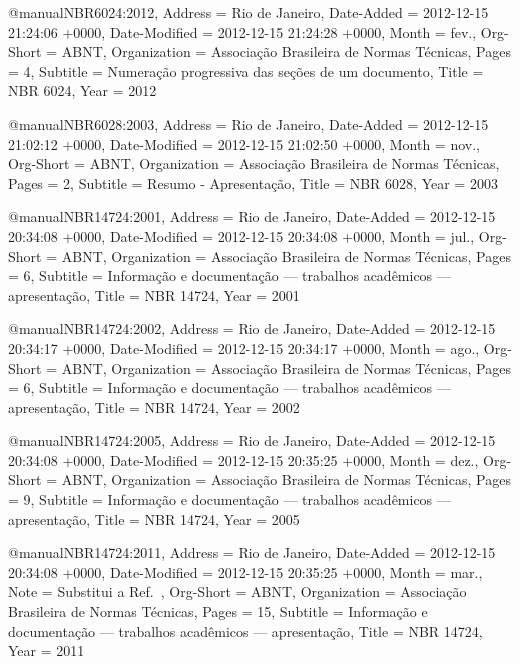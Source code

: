 @manual{NBR6024:2012,
	Address = {Rio de Janeiro},
	Date-Added = {2012-12-15 21:24:06 +0000},
	Date-Modified = {2012-12-15 21:24:28 +0000},
	Month = {fev.},
	Org-Short = {ABNT},
	Organization = {Associa{\c c}\~ao Brasileira de Normas T\'ecnicas},
	Pages = 4,
	Subtitle = {Numera{\c c}\~ao progressiva das se{\c c}\~oes de um documento},
	Title = {{NBR} 6024},
	Year = 2012}

@manual{NBR6028:2003,
	Address = {Rio de Janeiro},
	Date-Added = {2012-12-15 21:02:12 +0000},
	Date-Modified = {2012-12-15 21:02:50 +0000},
	Month = {nov.},
	Org-Short = {ABNT},
	Organization = {Associa{\c c}\~ao Brasileira de Normas T\'ecnicas},
	Pages = 2,
	Subtitle = {Resumo - Apresenta{\c c}{\~a}o},
	Title = {{NBR} 6028},
	Year = 2003}

@manual{NBR14724:2001,
	Address = {Rio de Janeiro},
	Date-Added = {2012-12-15 20:34:08 +0000},
	Date-Modified = {2012-12-15 20:34:08 +0000},
	Month = {jul.},
	Org-Short = {ABNT},
	Organization = {Associa{\c c}\~ao Brasileira de Normas T\'ecnicas},
	Pages = 6,
	Subtitle = {Informa{\c c}\~ao e documenta{\c c}\~ao --- trabalhos acad\^emicos --- apresenta{\c c}\~ao},
	Title = {{NBR} 14724},
	Year = 2001}

@manual{NBR14724:2002,
	Address = {Rio de Janeiro},
	Date-Added = {2012-12-15 20:34:17 +0000},
	Date-Modified = {2012-12-15 20:34:17 +0000},
	Month = {ago.},
	Org-Short = {ABNT},
	Organization = {Associa{\c c}\~ao Brasileira de Normas T\'ecnicas},
	Pages = 6,
	Subtitle = {Informa{\c c}\~ao e documenta{\c c}\~ao --- trabalhos acad\^emicos --- apresenta{\c c}\~ao},
	Title = {{NBR} 14724},
	Year = 2002}

@manual{NBR14724:2005,
	Address = {Rio de Janeiro},
	Date-Added = {2012-12-15 20:34:08 +0000},
	Date-Modified = {2012-12-15 20:35:25 +0000},
	Month = {dez.},
	Org-Short = {ABNT},
	Organization = {Associa{\c c}\~ao Brasileira de Normas T\'ecnicas},
	Pages = 9,
	Subtitle = {Informa{\c c}\~ao e documenta{\c c}\~ao --- trabalhos acad\^emicos --- apresenta{\c c}\~ao},
	Title = {{NBR} 14724},
	Year = 2005}

@manual{NBR14724:2011,
	Address = {Rio de Janeiro},
	Date-Added = {2012-12-15 20:34:08 +0000},
	Date-Modified = {2012-12-15 20:35:25 +0000},
	Month = {mar.},
	Note = {Substitui a Ref.~},
	Org-Short = {ABNT},
	Organization = {Associa{\c c}\~ao Brasileira de Normas T\'ecnicas},
	Pages = 15,
	Subtitle = {Informa{\c c}\~ao e documenta{\c c}\~ao --- trabalhos acad\^emicos --- apresenta{\c c}\~ao},
	Title = {{NBR} 14724},
	Year = 2011}

